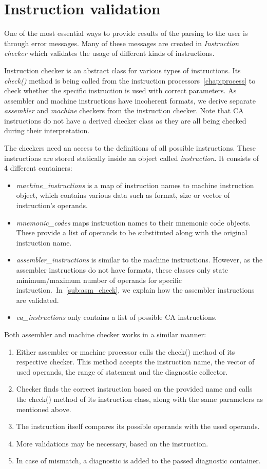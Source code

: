 \section{Instruction validation}

One of the most essential ways to provide results of the parsing to the user is through error messages. Many of these messages are created in \emph{Instruction checker} which validates the usage of different kinds of instructions.

Instruction checker is an abstract class for various types of instructions. Its \emph{check()} method is being called from the instruction processors~\ref{chap:process} to check whether the specific instruction is used with correct parameters. As assembler and machine instructions have incoherent formats, we derive separate \emph{assembler} and \emph{machine} checkers from the instruction checker. Note that CA instructions do not have a derived checker class as they are all being checked during their interpretation.

The checkers need an access to the definitions of all possible instructions. These instructions are stored statically inside an object called \emph{instruction}. It consists of 4 different containers:
\begin{itemize}
	\item \emph{machine\_instructions} is a map of instruction names to machine instruction object, which contains various data such as format, size or vector of instruction's operands.
	\item \emph{mnemonic\_codes} maps instruction names to their mnemonic code objects. These provide a list of operands to be substituted along with the original instruction name.
	\item \emph{assembler\_instructions} is similar to the machine instructions. However, as the assembler instructions do not have formats, these classes only state minimum/maximum number of operands for specific instruction.~In~\cref{sub:asm_check}, we explain how the assembler instructions are validated.
	\item \emph{ca\_instructions} only contains a list of possible CA instructions.
\end{itemize}

Both assembler and machine checker works in a similar manner:
\begin{enumerate}
	\item Either assembler or machine processor calls the check() method of its respective checker. This method accepts the instruction name, the vector of used operands, the range of statement and the diagnostic collector.
	\item Checker finds the correct instruction based on the provided name and calls the check() method of its instruction class, along with the same parameters as mentioned above.
	\item The instruction itself compares its possible operands with the used operands.
	\item More validations may be necessary, based on the instruction.
	\item In case of mismatch, a diagnostic is added to the passed diagnostic container.
\end{enumerate}

